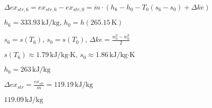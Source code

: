 \( \Delta ex_{str,6} = ex_{str,6} - ex_{str,0} = \dot{m} \cdot (h_6 - h_0 - T_0(s_6 - s_0) + \Delta ke) \)  

\( h_6 = 333.93 \, \text{kJ/kg}, \, h_0 = h(265.15 \, \text{K}) \)  

\( s_6 = s(T_6), \, s_0 = s(T_0), \, \Delta ke = \frac{w_6^2 - w_0^2}{2} \)  

\( s(T_6) \approx 1.79 \, \text{kJ/kg·K}, \, s_0 \approx 1.86 \, \text{kJ/kg·K} \)  

\( h_0 = 263 \, \text{kJ/kg} \)  

\( \Delta ex_{str} = \frac{ex_{str}}{\dot{m}} = 119.19 \, \text{kJ/kg} \)  

\( 119.09 \, \text{kJ/kg} \)